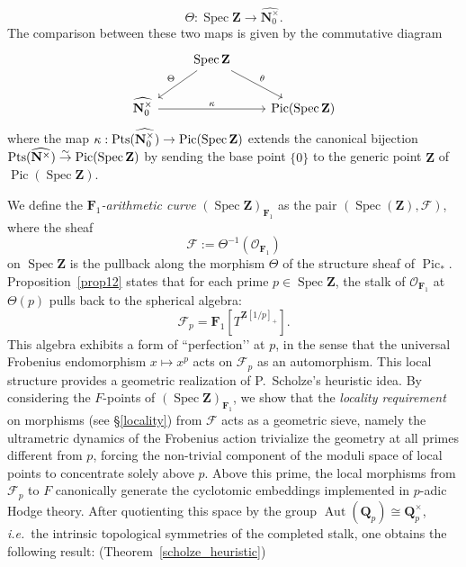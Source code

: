 \documentclass[11pt,a4paper]{article}
\newcommand{\N}{\mathbf{N}}
\newcommand{\Q}{\mathbf{Q}}
\newcommand{\Z}{\mathbf{Z}}
\newcommand{\Fone}{\mathbf{F}_{1}}
\def\spz{\Spec \Z}
\def\spzf{(\Spec \Z)_{\mathbf{F}_{1}}}
\newcommand{\nat}{\widehat{\N^\times}}
\newcommand{\nato}{\widehat{\N^\times_0}}
\newcommand{\Pt}{{\rm Pts}}
\newcommand{\Spec}{\operatorname{Spec}}
\newcommand{\Pic}{\operatorname{Pic}} \newcommand{\Jac}{\operatorname{Jac}}
\newcommand{\picone}{{\Pic}_{*}}
\def\ie{{\it i.e.\/}\ }
\begin{document}
\begin{equation}\label{spzmap1}
\Theta: \spz \longrightarrow \nato.
\end{equation}
The comparison between these two maps is given by the commutative  diagram 
\begin{equation}\label{top2ad}
\begin{tikzcd}
&\spz \arrow[dl,"\Theta"']\arrow[dr,"\theta"] & 
 \\
\nato \arrow[rr, "\kappa"]& & \Pic(\spz)
\end{tikzcd}
\end{equation}
where the map $\kappa:\Pt(\nato)\to \Pic(\spz)$ extends the canonical bijection $\Pt(\nat)\stackrel{\sim}{\to} \Pic(\spz)$ by sending the base point $\{0\}$ to the generic point $\Z$ of $\Pic(\spz)$. \vspace{.03in}

We define the \emph{$\Fone$-arithmetic curve} $\spzf$ as the pair $(\Spec(\Z), \mathcal{F})$, where the sheaf
\[
\mathcal{F} := \Theta^{-1}(\mathcal{O}_{\Fone})
\]
on $\spz$ is the pullback along the morphism $\Theta$ of the structure sheaf of $\picone$.
 Proposition~\ref{prop12} states that for each prime $p \in \spz$, the stalk of $\mathcal O_{\mathbf F_1}$ at $\Theta(p)$ pulls back to the spherical algebra:
\[
\mathcal{F}_p = \Fone[T^{\Z[1/p]_+}].
\]
This algebra  exhibits a form of ``perfection’’ at $p$, in the sense that the universal Frobenius endomorphism $x \mapsto x^p$ acts on $\mathcal{F}_p$ as an automorphism.
This local structure provides a  geometric realization of  P.~Scholze's heuristic idea.
By considering the $F$-points of  $\spzf$, we show that the \emph{locality requirement} on morphisms (see  \S \ref{locality}) from $\mathcal F$  acts as a geometric sieve, namely the ultrametric dynamics of the Frobenius action trivialize the geometry at all primes different from $p$, forcing the non-trivial component of the moduli space of local points to concentrate solely above  $p$.
Above this prime, the local morphisms from  $\mathcal{F}_p$ to $F$ canonically generate the cyclotomic embeddings implemented in $p$-adic Hodge theory. After quotienting this space by the group $\operatorname{Aut}(\Q_p) \cong \Q_p^\times$, \ie the intrinsic topological symmetries of the completed stalk, one obtains the following result: (Theorem~\ref{scholze_heuristic})
\end{document}
